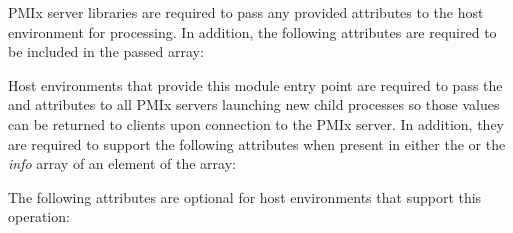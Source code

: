 \reqattrstart
\ac{PMIx} server libraries are required to pass any provided attributes to the host environment for processing. In addition, the following attributes are required to be included in the passed  array:


\divider

Host environments that provide this module entry point are required to pass the  and  attributes to all \ac{PMIx} servers launching new child processes so those values can be returned to clients upon connection to the \ac{PMIx} server. In addition, they are required to support the following attributes when present in either the  or the \textit{info} array of an element of the  array:


\reqattrend

\optattrstart
The following attributes are optional for host environments that support this operation:


